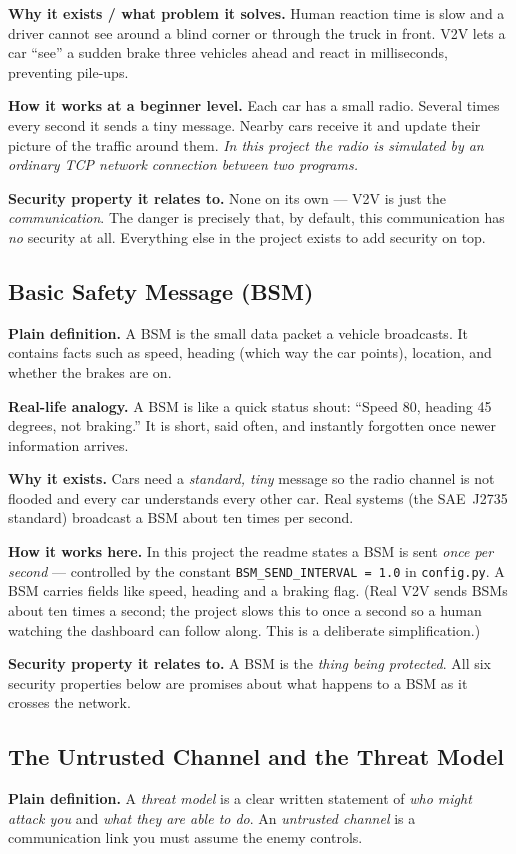 \documentclass[11pt,a4paper]{article}
\begin{document}
\textbf{Why it exists / what problem it solves.} Human reaction time is slow and
a driver cannot see around a blind corner or through the truck in front. V2V
lets a car ``see'' a sudden brake three vehicles ahead and react in
milliseconds, preventing pile-ups.

\textbf{How it works at a beginner level.} Each car has a small radio. Several
times every second it sends a tiny message. Nearby cars receive it and update
their picture of the traffic around them. \emph{In this project the radio is
simulated by an ordinary TCP network connection between two programs.}

\textbf{Security property it relates to.} None on its own --- V2V is just the
\emph{communication}. The danger is precisely that, by default, this
communication has \emph{no} security at all. Everything else in the project
exists to add security on top.

\subsection{Basic Safety Message (BSM)}
\textbf{Plain definition.} A BSM is the small data packet a vehicle broadcasts.
It contains facts such as speed, heading (which way the car points), location,
and whether the brakes are on.

\textbf{Real-life analogy.} A BSM is like a quick status shout: ``Speed 80,
heading 45 degrees, not braking.'' It is short, said often, and instantly
forgotten once newer information arrives.

\textbf{Why it exists.} Cars need a \emph{standard, tiny} message so the radio
channel is not flooded and every car understands every other car. Real systems
(the SAE~J2735 standard) broadcast a BSM about ten times per second.

\textbf{How it works here.} In this project the readme states a BSM is sent
\emph{once per second} --- controlled by the constant
\texttt{BSM\_SEND\_INTERVAL = 1.0} in \texttt{config.py}. A BSM carries fields
like speed, heading and a braking flag. (Real V2V sends BSMs about ten times a
second; the project slows this to once a second so a human watching the
dashboard can follow along. This is a deliberate simplification.)

\textbf{Security property it relates to.} A BSM is the \emph{thing being
protected}. All six security properties below are promises about what happens
to a BSM as it crosses the network.

\subsection{The Untrusted Channel and the Threat Model}
\textbf{Plain definition.} A \emph{threat model} is a clear written statement of
\emph{who might attack you} and \emph{what they are able to do}. An
\emph{untrusted channel} is a communication link you must assume the enemy
controls.
\end{document}

